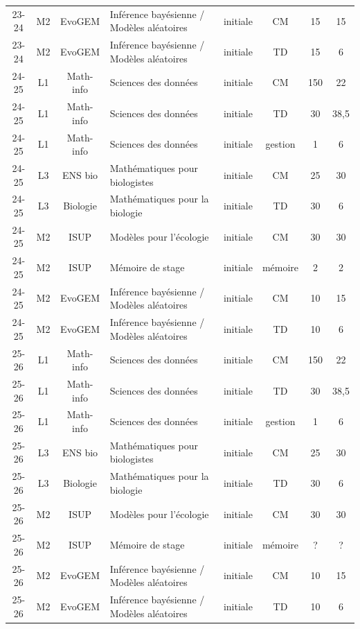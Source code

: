 \begin{tabular}{|c|c|c|p{}|c|c|c|c|}
23-24 & M2 & EvoGEM & Inférence bayésienne / Modèles aléatoires & initiale & CM & 15 & 15 \\ 
23-24 & M2 & EvoGEM & Inférence bayésienne / Modèles aléatoires & initiale & TD & 15 & 6 \\ 
\hline
\hline
24-25 & L1 & Math-info & Sciences des données & initiale & CM & 150 & 22 \\ 
24-25 & L1 & Math-info & Sciences des données & initiale & TD & 30 & 38,5 \\ 
24-25 & L1 & Math-info & Sciences des données & initiale & gestion & 1 & 6 \\ 
24-25 & L3 & ENS bio & Mathématiques pour biologistes & initiale & CM & 25 & 30 \\ 
24-25 & L3 & Biologie & Mathématiques pour la biologie & initiale & TD & 30 & 6 \\ 
24-25 & M2 & ISUP & Modèles pour l’écologie & initiale & CM & 30 & 30 \\ 
24-25 & M2 & ISUP & Mémoire de stage & initiale & mémoire & 2 & 2 \\ 
24-25 & M2 & EvoGEM & Inférence bayésienne / Modèles aléatoires & initiale & CM & 10 & 15 \\ 
24-25 & M2 & EvoGEM & Inférence bayésienne / Modèles aléatoires & initiale & TD & 10 & 6 \\ 
\hline
\hline
25-26 & L1 & Math-info & Sciences des données & initiale & CM & 150 & 22 \\ 
25-26 & L1 & Math-info & Sciences des données & initiale & TD & 30 & 38,5 \\ 
25-26 & L1 & Math-info & Sciences des données & initiale & gestion & 1 & 6 \\ 
25-26 & L3 & ENS bio & Mathématiques pour biologistes & initiale & CM & 25 & 30 \\ 
25-26 & L3 & Biologie & Mathématiques pour la biologie & initiale & TD & 30 & 6 \\ 
25-26 & M2 & ISUP & Modèles pour l’écologie & initiale & CM & 30 & 30 \\ 
25-26 & M2 & ISUP & Mémoire de stage & initiale & mémoire & ? & ? \\ 
25-26 & M2 & EvoGEM & Inférence bayésienne / Modèles aléatoires & initiale & CM & 10 & 15 \\ 
25-26 & M2 & EvoGEM & Inférence bayésienne / Modèles aléatoires & initiale & TD & 10 & 6 \\
\hline
\end{tabular}
